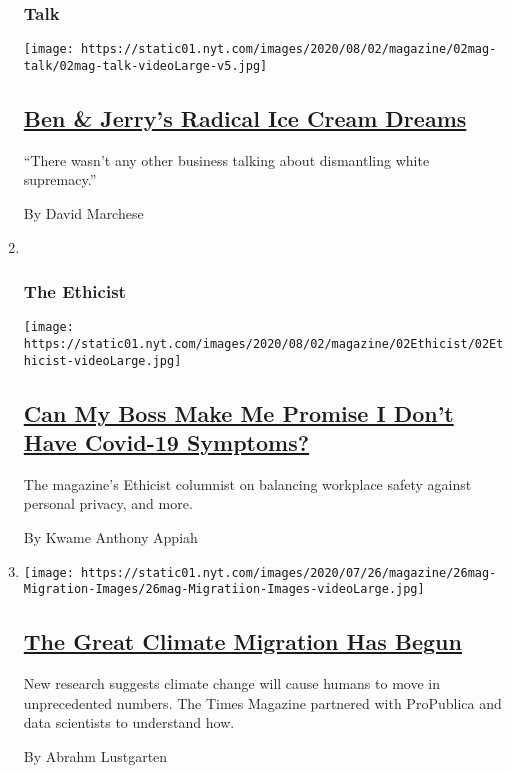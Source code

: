 \begin{enumerate}
{  \subsubsection{Talk}\label{talk}}

  \texttt{[image: https://static01.nyt.com/images/2020/08/02/magazine/02mag-talk/02mag-talk-videoLarge-v5.jpg]}

  \hypertarget{ben--jerrys-radical-ice-cream-dreams}{%
  \subsection{\texorpdfstring{\href{/interactive/2020/07/27/magazine/ben-jerry-interview.html}{Ben
  \& Jerry's Radical Ice Cream
  Dreams}}{Ben \& Jerry's Radical Ice Cream Dreams}}\label{ben--jerrys-radical-ice-cream-dreams}}

  ``There wasn't any other business talking about dismantling white
  supremacy.''

  By David Marchese
\item ~
  \hypertarget{the-ethicist}{%
  \subsubsection{The Ethicist}\label{the-ethicist}}

  \texttt{[image: https://static01.nyt.com/images/2020/08/02/magazine/02Ethicist/02Ethicist-videoLarge.jpg]}

  \hypertarget{can-my-boss-make-me-promise-i-dont-have-covid-19-symptoms}{%
  \subsection{\texorpdfstring{\href{/2020/07/28/magazine/can-my-boss-make-me-promise-i-dont-have-covid-19-symptoms.html}{Can
  My Boss Make Me Promise I Don't Have Covid-19
  Symptoms?}}{Can My Boss Make Me Promise I Don't Have Covid-19 Symptoms?}}\label{can-my-boss-make-me-promise-i-dont-have-covid-19-symptoms}}

  The magazine's Ethicist columnist on balancing workplace safety
  against personal privacy, and more.

  By Kwame Anthony Appiah
\item
  \texttt{[image: https://static01.nyt.com/images/2020/07/26/magazine/26mag-Migration-Images/26mag-Migratiion-Images-videoLarge.jpg]}

  \hypertarget{the-great-climate-migration-has-begun}{%
  \subsection{\texorpdfstring{\href{/interactive/2020/07/23/magazine/climate-migration.html}{The
  Great Climate Migration Has
  Begun}}{The Great Climate Migration Has Begun}}\label{the-great-climate-migration-has-begun}}

  New research suggests climate change will cause humans to move in
  unprecedented numbers. The Times Magazine partnered with ProPublica
  and data scientists to understand how.

  By Abrahm Lustgarten
\end{enumerate}

